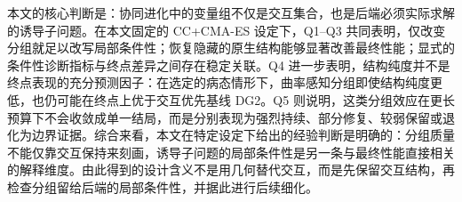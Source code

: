 本文的核心判断是：协同进化中的变量组不仅是交互集合，也是后端必须实际求解的诱导子问题。在本文固定的 CC+CMA-ES 设定下，Q1--Q3 共同表明，仅改变分组就足以改写局部条件性；恢复隐藏的原生结构能够显著改善最终性能；显式的条件性诊断指标与终点差异之间存在稳定关联。Q4 进一步表明，结构纯度并不是终点表现的充分预测因子：在选定的病态情形下，曲率感知分组即使结构纯度更低，也仍可能在终点上优于交互优先基线 DG2。Q5 则说明，这类分组效应在更长预算下不会收敛成单一结局，而是分别表现为强烈持续、部分修复、较弱保留或退化为边界证据。综合来看，本文在特定设定下给出的经验判断是明确的：分组质量不能仅靠交互保持来刻画，诱导子问题的局部条件性是另一条与最终性能直接相关的解释维度。由此得到的设计含义不是用几何替代交互，而是先保留交互结构，再检查分组留给后端的局部条件性，并据此进行后续细化。

